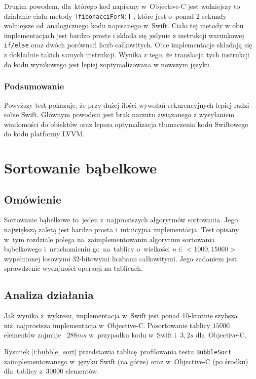 \documentclass[mgr, shortabstract]{iithesis}
\newcommand{\objcinline}[1]{
    \texttt{#1}
}
\begin{document}
Drugim powodem, dla~którego kod napisany w~Objective-C jest wolniejszy to działanie ciała metody \objcinline{[fibonacciForN:]}, które jest o~ponad 2 sekundy wolniejsze od~analogicznego kodu napisanego w~Swift. Ciało tej metody w obu implementacjach jest bardzo proste i składa się jedynie z instrukcji warunkowej \objcinline{if/else} oraz dwóch porównań liczb całkowitych. Obie implementacje składają się z dokładnie takich samych instrukcji. Wynika z tego, że translacja tych instrukcji do kodu wynikowego jest lepiej zoptymalizowana w nowszym języku.

\subsubsection{Podsumowanie}

Powyższy test pokazuje, że przy dużej ilości wywołań rekurencyjnych lepiej radzi sobie Swift. Głównym powodem jest brak narzutu związanego z wysyłaniem wiadomości do obiektów oraz lepsza optymalizacja tłumaczenia kodu Swiftowego do kodu platformy LVVM.

\section{Sortowanie bąbelkowe}
\label{s:bubble_sort}

\subsection{Omówienie}

Sortowanie bąbelkowe to~jeden z~najprostszych algorytmów sortowania. Jego największą zaletą jest bardzo prosta i~intuicyjna implementacja. Test opisany w~tym rozdziale polega na~zaimplementowaniu algorytmu sortowania bąbelkowego i~uruchomieniu go~na~tablicy o~wielkości $n \in <1000, 15000>$ wypełnionej losowymi 32-bitowymi liczbami całkowitymi. Jego zadaniem jest sprawdzenie wydajności operacji na tablicach. 

\subsection{Analiza działania}

Jak wynika z~wykresu, implementacja w~Swift jest ponad 10-krotnie szybsza niż najprostsza implementacja w~Objective-C. Posortowanie tablicy $15000$ elementów zajmuje ~$288 ms$ w~przypadku kodu w~Swift i~$3,2 s$ dla~Objective-C.

Rysunek \ref{i:bubble_sort} przedstawia tablicę profilowania testu \texttt{BubbleSort} zaimplementowanego w~języku Swift (na górze) oraz w~Objective-C (po środku) dla~tablicy z~30000 elementów.
\end{document}
